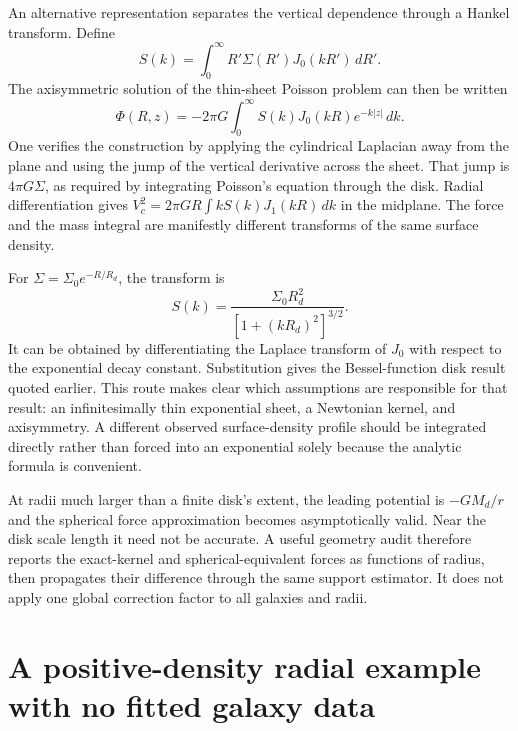 An alternative representation separates the vertical dependence through a Hankel transform. Define
\begin{equation}
 S(k)=\int_0^\infty R'\Sigma(R')J_0(kR')\,dR'.
 \label{c10:hankel}
\end{equation}
The axisymmetric solution of the thin-sheet Poisson problem can then be written
\begin{equation}
 \Phi(R,z)=-2\pi G\int_0^\infty
 S(k)J_0(kR)e^{-k|z|}\,dk.
 \label{c10:hankelpotential}
\end{equation}
One verifies the construction by applying the cylindrical Laplacian away from the plane and using the jump of the vertical derivative across the sheet. That jump is $4\pi G\Sigma$, as required by integrating Poisson's equation through the disk. Radial differentiation gives $V_c^2=2\pi GR\int kS(k)J_1(kR)\,dk$ in the midplane. The force and the mass integral are manifestly different transforms of the same surface density.

For $\Sigma=\Sigma_0e^{-R/R_d}$, the transform is
\begin{equation}
 S(k)=\frac{\Sigma_0R_d^2}{[1+(kR_d)^2]^{3/2}}.
 \label{c10:exponentialtransform}
\end{equation}
It can be obtained by differentiating the Laplace transform of $J_0$ with respect to the exponential decay constant. Substitution gives the Bessel-function disk result quoted earlier. This route makes clear which assumptions are responsible for that result: an infinitesimally thin exponential sheet, a Newtonian kernel, and axisymmetry. A different observed surface-density profile should be integrated directly rather than forced into an exponential solely because the analytic formula is convenient.

At radii much larger than a finite disk's extent, the leading potential is $-GM_d/r$ and the spherical force approximation becomes asymptotically valid. Near the disk scale length it need not be accurate. A useful geometry audit therefore reports the exact-kernel and spherical-equivalent forces as functions of radius, then propagates their difference through the same support estimator. It does not apply one global correction factor to all galaxies and radii.

\section{A positive-density radial example with no fitted galaxy data}

